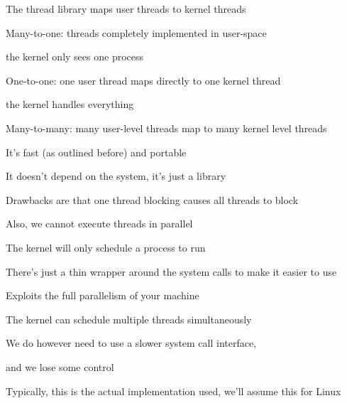   \begin{slide}


    The thread library maps user threads to kernel threads
    \medskip

    Many-to-one: threads completely implemented in user-space

    \leftspace{}the kernel only sees one process
    \medskip

    One-to-one: one user thread maps directly to one kernel thread

    \leftspace{}the kernel handles everything
    \medskip

    Many-to-many: many user-level threads map to many kernel level threads

  \end{slide}

  \begin{slide}


    It's fast (as outlined before) and portable

    \leftspace{}It doesn't depend on the system, it's just a library
    \medskip

    Drawbacks are that one thread blocking causes all threads to block

    \leftspace{}Also, we cannot execute threads in parallel

    \leftspace{}\leftspace{}The kernel will only schedule a process to run

  \end{slide}

  \begin{slide}


    There's just a thin wrapper around the system calls to make it easier to use
    \medskip

    Exploits the full parallelism of your machine

    \leftspace{}The kernel can schedule multiple threads simultaneously
    \medskip

    We do however need to use a slower system call interface,

    \leftspace{}and we lose some control
    \bigskip

    Typically, this is the actual implementation used, we'll assume this for
    Linux

  \end{slide}

